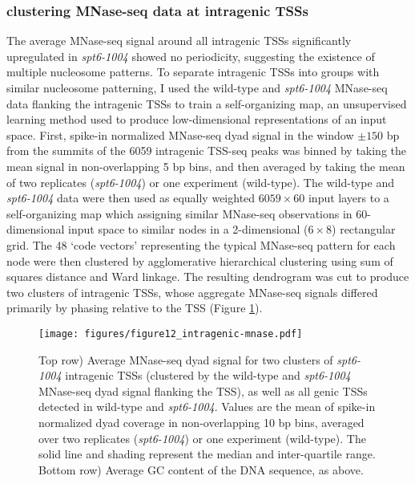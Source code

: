 \documentclass[9pt, letterpaper]{article}
\begin{document}
\subsubsection{clustering MNase-seq data at intragenic TSSs}

The average MNase-seq signal around all intragenic TSSs significantly upregulated in \textit{spt6-1004} showed no periodicity, suggesting the existence of multiple nucleosome patterns. To separate intragenic TSSs into groups with similar nucleosome patterning, I used the wild-type and \textit{spt6-1004} MNase-seq data flanking the intragenic TSSs to train a self-organizing map, an unsupervised learning method used to produce low-dimensional representations of an input space. First, spike-in normalized MNase-seq dyad signal in the window $\pm 150$ bp from the summits of the 6059 intragenic TSS-seq peaks was binned by taking the mean signal in non-overlapping 5 bp bins, and then averaged by taking the mean of two replicates (\textit{spt6-1004}) or one experiment (wild-type). The wild-type and \textit{spt6-1004} data were then used as equally weighted $6059 \times 60$ input layers to a self-organizing map which assigning similar MNase-seq observations in 60-dimensional input space to similar nodes in a 2-dimensional ($6 \times 8$) rectangular grid. The 48 `code vectors' representing the typical MNase-seq pattern for each node were then clustered by agglomerative hierarchical clustering using sum of squares distance and Ward linkage. The resulting dendrogram was cut to produce two clusters of intragenic TSSs, whose aggregate MNase-seq signals differed primarily by phasing relative to the TSS (Figure \ref{fig:intra_mnase_metagene}).

\begin{figure}[H]
\centering
\texttt{[image: figures/figure12\_intragenic-mnase.pdf]}
\caption{Top row) Average MNase-seq dyad signal for two clusters of \textit{spt6-1004} intragenic TSSs (clustered by the wild-type and \textit{spt6-1004} MNase-seq dyad signal flanking the TSS), as well as all genic TSSs detected in wild-type and \textit{spt6-1004}. Values are the mean of spike-in normalized dyad coverage in non-overlapping 10 bp bins, averaged over two replicates (\textit{spt6-1004}) or one experiment (wild-type). The solid line and shading represent the median and inter-quartile range. Bottom row) Average GC content of the DNA sequence, as above.}
\label{fig:intra_mnase_metagene}
\end{figure}
\end{document}
